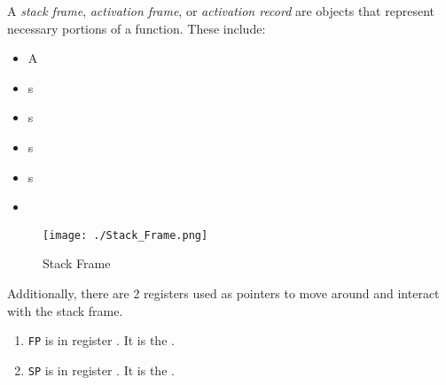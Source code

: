 \begin{definition}\label{def:Stack_Frame}
  A \emph{stack frame}, \emph{activation frame}, or \emph{activation record} are objects that represent necessary portions of a function.
  These include:
  \begin{itemize}[noitemsep]
  \item A 
  \item {}s
  \item {}s
  \item {}s
  \item {}s
  \item {}
  \end{itemize}

  \begin{figure}[h!]
    \centering
    \texttt{[image: ./Stack\_Frame.png]}
    \caption{Stack Frame}
    \label{fig:Stack_Frame}
  \end{figure}

  Additionally, there are 2 registers used as pointers to move around and interact with the stack frame.
  \begin{enumerate}[noitemsep]
  \item \texttt{FP} is in register \rbpRegister{}. It is the .
  \item \texttt{SP} is in register \rspRegister{}. It is the .
  \end{enumerate}
\end{definition}

